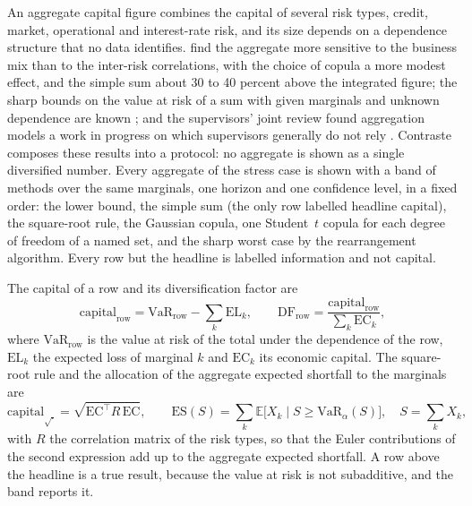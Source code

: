 An aggregate capital figure combines the capital of several risk types, credit, market, operational and interest-rate risk, and its size depends on a dependence structure that
no data identifies. \citet{aggregation-stress:rosenberg2006} find the aggregate more sensitive to the business mix than to the inter-risk correlations, with the choice of
copula a more modest effect, and the simple sum about 30 to 40 percent above the integrated figure; the sharp bounds on the value at risk of a sum with given marginals and unknown dependence are
known \citep{aggregation-stress:embrechts2013}; and the supervisors' joint review found aggregation models a work in progress on which supervisors generally do not rely
\citep{aggregation-stress:jointforum2010}. Contraste composes these results into a protocol: no aggregate is shown as a single diversified number. Every aggregate of the stress case is
shown with a band of methods over the same marginals, one horizon and one confidence level, in a fixed order: the lower bound, the simple sum (the only row labelled headline
capital), the square-root rule, the Gaussian copula, one Student~$t$ copula for each degree of freedom of a named set, and the sharp worst case by the rearrangement algorithm. Every
row but the headline is labelled information and not capital.

The capital of a row and its diversification factor are
\begin{equation}
\text{capital}_{\mathrm{row}}=\mathrm{VaR}_{\mathrm{row}}-\sum_{k}\mathrm{EL}_{k},\qquad
\mathrm{DF}_{\mathrm{row}}=\frac{\text{capital}_{\mathrm{row}}}{\sum_{k}\mathrm{EC}_{k}},
\label{eq:bs9-band}
\end{equation}
where $\mathrm{VaR}_{\mathrm{row}}$ is the value at risk of the total under the dependence of the row, $\mathrm{EL}_{k}$ the expected loss of marginal $k$ and
$\mathrm{EC}_{k}$ its economic capital. The square-root rule and the allocation of the aggregate expected shortfall to the marginals are
\begin{equation}
\text{capital}_{\sqrt{\cdot}}=\sqrt{\mathrm{EC}^{\top}R\,\mathrm{EC}},\qquad
\mathrm{ES}(S)=\sum_{k}\mathbb E\big[X_k\mid S\ge \mathrm{VaR}_{\alpha}(S)\big],\quad S=\sum_{k}X_k,
\label{eq:bs9-euler}
\end{equation}
with $R$ the correlation matrix of the risk types, so that the Euler contributions of the second expression add up to the aggregate expected shortfall. A row above the headline is a true
result, because the value at risk is not subadditive, and the band reports it.

